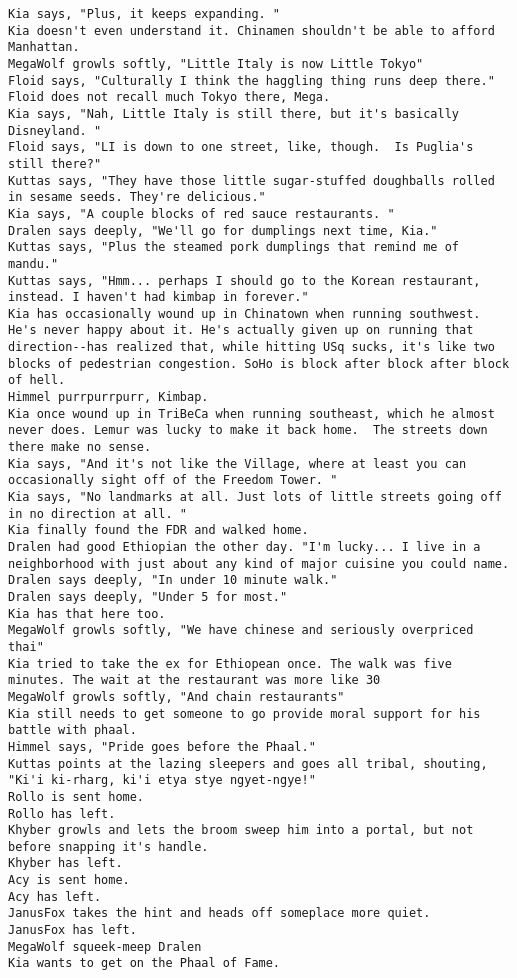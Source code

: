 \begin{verbatim}
Kia says, "Plus, it keeps expanding. "
Kia doesn't even understand it. Chinamen shouldn't be able to afford Manhattan.
MegaWolf growls softly, "Little Italy is now Little Tokyo"
Floid says, "Culturally I think the haggling thing runs deep there."
Floid does not recall much Tokyo there, Mega.
Kia says, "Nah, Little Italy is still there, but it's basically Disneyland. "
Floid says, "LI is down to one street, like, though.  Is Puglia's still there?"
Kuttas says, "They have those little sugar-stuffed doughballs rolled in sesame seeds. They're delicious."
Kia says, "A couple blocks of red sauce restaurants. "
Dralen says deeply, "We'll go for dumplings next time, Kia."
Kuttas says, "Plus the steamed pork dumplings that remind me of mandu."
Kuttas says, "Hmm... perhaps I should go to the Korean restaurant, instead. I haven't had kimbap in forever."
Kia has occasionally wound up in Chinatown when running southwest. He's never happy about it. He's actually given up on running that direction--has realized that, while hitting USq sucks, it's like two blocks of pedestrian congestion. SoHo is block after block after block of hell.
Himmel purrpurrpurr, Kimbap.
Kia once wound up in TriBeCa when running southeast, which he almost never does. Lemur was lucky to make it back home.  The streets down there make no sense.
Kia says, "And it's not like the Village, where at least you can occasionally sight off of the Freedom Tower. "
Kia says, "No landmarks at all. Just lots of little streets going off in no direction at all. "
Kia finally found the FDR and walked home.
Dralen had good Ethiopian the other day. "I'm lucky... I live in a neighborhood with just about any kind of major cuisine you could name.
Dralen says deeply, "In under 10 minute walk."
Dralen says deeply, "Under 5 for most."
Kia has that here too.
MegaWolf growls softly, "We have chinese and seriously overpriced thai"
Kia tried to take the ex for Ethiopean once. The walk was five minutes. The wait at the restaurant was more like 30
MegaWolf growls softly, "And chain restaurants"
Kia still needs to get someone to go provide moral support for his battle with phaal.
Himmel says, "Pride goes before the Phaal."
Kuttas points at the lazing sleepers and goes all tribal, shouting, "Ki'i ki-rharg, ki'i etya stye ngyet-ngye!"
Rollo is sent home.
Rollo has left.
Khyber growls and lets the broom sweep him into a portal, but not before snapping it's handle.
Khyber has left.
Acy is sent home.
Acy has left.
JanusFox takes the hint and heads off someplace more quiet.
JanusFox has left.
MegaWolf squeek-meep Dralen
Kia wants to get on the Phaal of Fame.

\end{verbatim}
